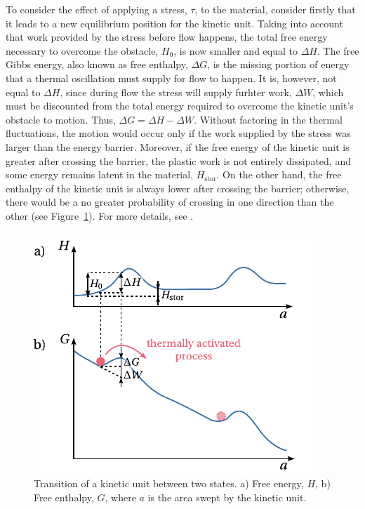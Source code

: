 To consider the effect of applying a stress, $\tau$, to the material, consider firstly that it leads to a new equilibrium position for the kinetic unit.
Taking into account that work provided by the stress before flow happens, the total free energy necessary to overcome the obstacle, $H_0$, is now smaller and equal to $\Delta H$.
The free Gibbs energy, also known as free enthalpy, $\Delta G$, is the missing portion of energy that a thermal oscillation must supply for flow to happen.
It is, however, not equal to $\Delta H$, since during flow the stress will supply furhter work, $\Delta W$, which
must be discounted from the total energy required to overcome the kinetic unit's obstacle to motion.
Thus, $\Delta G = \Delta H - \Delta W$.
Without factoring in the thermal fluctuations, the motion would occur only if the work supplied by the stress was larger than the energy barrier.
Moreover, if the free energy of the kinetic unit is greater after crossing the barrier, the plastic work is not entirely dissipated, and some energy remains latent in the material, $H_\text{stor}$.
On the other hand, the free enthalpy of the kinetic unit is always lower after crossing the barrier; otherwise, there would be a no greater probability of crossing in one direction than the other (see Figure~\ref{fig:site_model_theory}).
For more details, see \cite{kocks1975thermodynamics}.
\begin{figure}
	\centering
	\includegraphics{figures/site_model_theory}
	\caption{Transition of a kinetic unit between two states. a) Free energy, $H$, b) Free enthalpy, $G$, where $a$ is the area swept by the kinetic unit.}
\label{fig:site_model_theory}
\end{figure}

